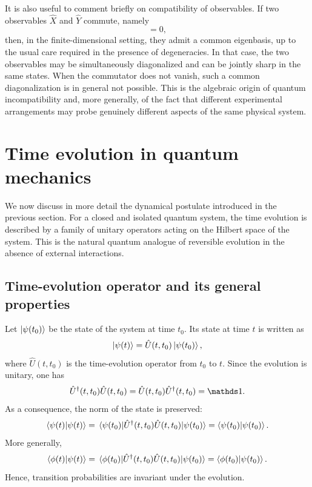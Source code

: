 It is also useful to comment briefly on compatibility of observables. If two observables $\hat X$ and $\hat Y$ commute, namely
\begin{equation}
	[\hat X,\hat Y]=0,
	\label{eq:intro_qm_commuting_observables}
\end{equation}
then, in the finite-dimensional setting, they admit a common eigenbasis, up to the usual care required in the presence of degeneracies. In that case, the two observables may be simultaneously diagonalized and can be jointly sharp in the same states. When the commutator does not vanish, such a common diagonalization is in general not possible. This is the algebraic origin of quantum incompatibility and, more generally, of the fact that different experimental arrangements may probe genuinely different aspects of the same physical system.

\section{Time evolution in quantum mechanics}
\label{sec:unitary_time_evolution_and_stationary_states}

We now discuss in more detail the dynamical postulate introduced in the previous section. For a closed and isolated quantum system, the time evolution is described by a family of unitary operators acting on the Hilbert space of the system. This is the natural quantum analogue of reversible evolution in the absence of external interactions.

\subsection{Time-evolution operator and its general properties}

Let $\ket{\psi(t_0)}$ be the state of the system at time $t_0$. Its state at time $t$ is written as
\begin{equation}
	\ket{\psi(t)}=\hat U(t,t_0)\ket{\psi(t_0)},
	\label{eq:intro_qm_state_evolution_operator}
\end{equation}
where $\hat U(t,t_0)$ is the time-evolution operator from $t_0$ to $t$. Since the evolution is unitary, one has
\begin{equation}
	\hat U^\dagger(t,t_0)\hat U(t,t_0)=\hat U(t,t_0)\hat U^\dagger(t,t_0)=\id.
	\label{eq:intro_qm_propagator_unitarity}
\end{equation}
As a consequence, the norm of the state is preserved:
\begin{equation}
	\braket{\psi(t)}{\psi(t)}
	=
	\matrixel{\psi(t_0)}{\hat U^\dagger(t,t_0)\hat U(t,t_0)}{\psi(t_0)}
	=
	\braket{\psi(t_0)}{\psi(t_0)}.
	\label{eq:intro_qm_norm_preservation_unitary}
\end{equation}
More generally,
\begin{equation}
	\braket{\phi(t)}{\psi(t)}
	=
	\matrixel{\phi(t_0)}{\hat U^\dagger(t,t_0)\hat U(t,t_0)}{\psi(t_0)}
	=
	\braket{\phi(t_0)}{\psi(t_0)}.
	\label{eq:intro_qm_inner_product_preservation}
\end{equation}
Hence, transition probabilities are invariant under the evolution.

